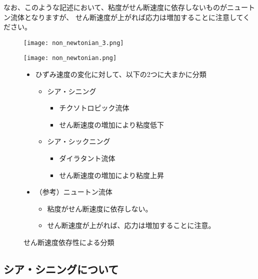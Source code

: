 \documentclass[uplatex,dvipdfmx,a4paper,11pt]{jsreport}
\begin{document}
なお、このような記述において、粘度がせん断速度に依存しないものがニュートン流体となりますが、
せん断速度が上がれば応力は増加することに注意してください。
\begin{figure}[htb]
	\begin{center}
		\begin{minipage}{0.45\textwidth}
			\begin{center}
			\texttt{[image: non\_newtonian\_3.png]}

			\vspace{20pt}

			\texttt{[image: non\_newtonian.png]}
			\end{center}
		\end{minipage}
		\begin{minipage}{0.45\textwidth}
			\begin{itemize}
				\item ひずみ速度の変化に対して、以下の2つに大まかに分類
				\begin{itemize}
					\item シア・シニング
					\begin{itemize}
						\item チクソトロピック流体
						\item せん断速度の増加により粘度低下
					\end{itemize}
					\item シア・シックニング
					\begin{itemize}
						\item ダイラタント流体
						\item せん断速度の増加により粘度上昇
					\end{itemize}
				\end{itemize}
				\item （参考）ニュートン流体
					\begin{itemize}
						\item 粘度がせん断速度に依存しない。
						\item せん断速度が上がれば、応力は増加することに注意。
					\end{itemize}
			\end{itemize}
		\end{minipage}
		\caption{せん断速度依存性による分類}
		\label{fig:shearrate_dep}
	\end{center}
\end{figure}

\subsection{シア・シニングについて}
\end{document}
